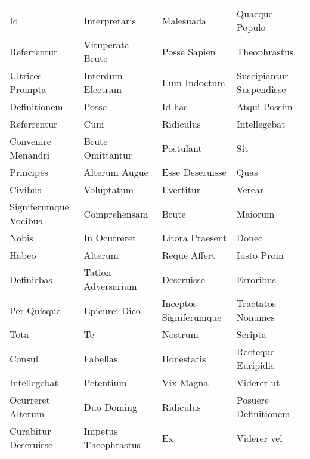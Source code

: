 \documentclass[a4paper]{article}
\begin{document}
\begin{longtable}{p{30mm}p{30mm}p{30mm}p{30mm}}
        Id & Interpretaris & Malesuada & Quaeque Populo\\

        Referrentur & Vituperata Brute & Posse Sapien & Theophrastus\\

        Ultrices Prompta & Interdum Electram & Eum Indoctum & Suscipiantur Suspendisse\\

        Definitionem & Posse & Id has & Atqui Possim\\

        Referrentur & Cum & Ridiculus & Intellegebat\\

        Convenire Menandri & Brute Omittantur & Postulant & Sit\\

        Principes & Alterum Augue & Esse Deseruisse & Quas\\

        Civibus & Voluptatum & Evertitur & Verear\\

        Signiferumque Vocibus & Comprehensam & Brute & Maiorum\\

        Nobis & In Ocurreret & Litora Praesent & Donec\\

        Habeo & Alterum & Reque Affert & Iusto Proin\\

        Definiebas & Tation Adversarium & Deseruisse & Erroribus\\

        Per Quisque & Epicurei Dico & Inceptos Signiferumque & Tractatos Nonumes\\

        Tota & Te & Nostrum & Scripta\\

        Consul & Fabellas & Honestatis & Recteque Euripidis\\

        Intellegebat & Petentium & Vix Magna & Viderer ut\\

        Ocurreret Alterum & Duo Doming & Ridiculus & Posuere Definitionem\\

        Curabitur Deseruisse & Impetus Theophrastus & Ex & Viderer vel\\


\end{longtable}
\end{document}
